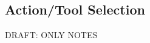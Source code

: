 \documentclass{article}
\begin{document}


\subsection{Action/Tool Selection}
DRAFT: ONLY NOTES
\end{document}
